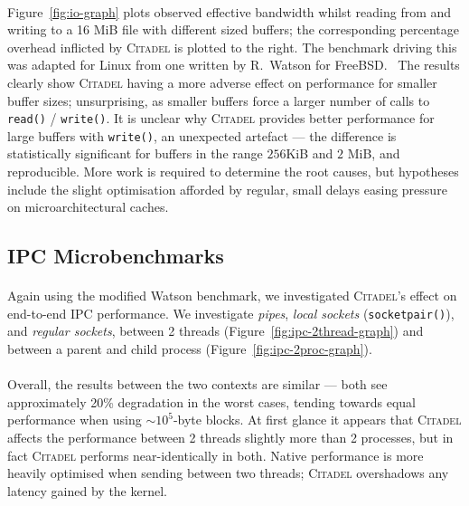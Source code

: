 \paragraph{} Figure~\ref{fig:io-graph} plots observed effective bandwidth whilst reading from and writing to a 16 MiB file with different sized buffers; the corresponding percentage overhead inflicted by \textsc{Citadel} is plotted to the right. The benchmark driving this was adapted for Linux from one written by R.~Watson for FreeBSD.~\cite{l41-benchmark} The results clearly show \textsc{Citadel} having a more adverse effect on performance for smaller buffer sizes; unsurprising, as smaller buffers force a larger number of calls to \texttt{read()} / \texttt{write()}. It is unclear why \textsc{Citadel} provides better performance for large buffers with \texttt{write()}, an unexpected artefact --- the difference is statistically significant for buffers in the range $256$KiB and $2$ MiB, and reproducible. More work is required to determine the root causes, but hypotheses include the slight optimisation afforded by regular, small delays easing pressure on microarchitectural caches.





\subsection{IPC Microbenchmarks}
\label{sec:ipc-microbenchmarks}

\paragraph{} Again using the modified Watson benchmark, we investigated \textsc{Citadel}'s effect on end-to-end IPC performance. We investigate \textit{pipes}, \textit{local sockets} (\texttt{socketpair()}), and \textit{regular sockets}, between 2 threads (Figure~\ref{fig:ipc-2thread-graph}) and between a parent and child process (Figure~\ref{fig:ipc-2proc-graph}).

\paragraph{} Overall, the results between the two contexts are similar --- both see approximately 20\% degradation in the worst cases, tending towards equal performance when using $\sim 10^5$-byte blocks. At first glance it appears that \textsc{Citadel} affects the performance between 2 threads slightly more than 2 processes, but in fact \textsc{Citadel} performs near-identically in both. Native performance is more heavily optimised when sending between two threads; \textsc{Citadel} overshadows any latency gained by the kernel.

